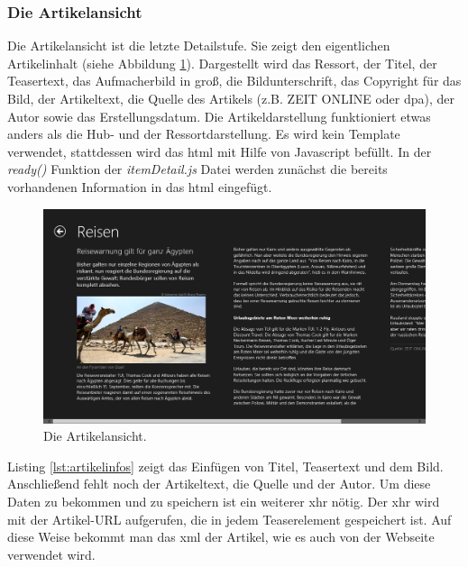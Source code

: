 \documentclass[12pt,a4paper,bibtotoc,abstracton]{scrartcl}
\begin{document}
\subsubsection{Die Artikelansicht}
\label{subsubsec:artikelansicht}
Die Artikelansicht ist die letzte Detailstufe. Sie zeigt den eigentlichen Artikelinhalt (siehe Abbildung \ref{fig:artikelansicht}). Dargestellt wird das Ressort, der Titel, der Teasertext, das Aufmacherbild in groß, die Bildunterschrift, das Copyright für das Bild, der Artikeltext, die Quelle des Artikels (z.B. ZEIT ONLINE oder dpa), der Autor sowie das Erstellungsdatum. Die Artikeldarstellung funktioniert etwas anders als die Hub- und der Ressortdarstellung. Es wird kein Template verwendet, stattdessen wird das \ac{html} mit Hilfe von Javascript befüllt. In der \textit{ready()} Funktion der \textit{itemDetail.js} Datei werden zunächst die bereits vorhandenen Information in das \ac{html} eingefügt.

\begin{figure}[h]
	\centering
	\includegraphics[width=\textwidth]{Bilder/Screenshots/app/reise_aegypten_4d.png} 
	\caption{Die Artikelansicht.}
	\label{fig:artikelansicht}
\end{figure}

Listing \ref{lst:artikelinfos} zeigt das Einfügen von Titel, Teasertext und  dem Bild. Anschließend fehlt noch der Artikeltext, die Quelle und der Autor. Um diese Daten zu bekommen und zu speichern ist ein weiterer \ac{xhr} nötig. Der \ac{xhr} wird mit der Artikel-URL aufgerufen, die in jedem Teaserelement gespeichert ist. Auf diese Weise bekommt man das \ac{xml} der Artikel, wie es auch von der Webseite verwendet wird. 

\begin{minipage}{\linewidth}
  
\end{minipage}
\end{document}
